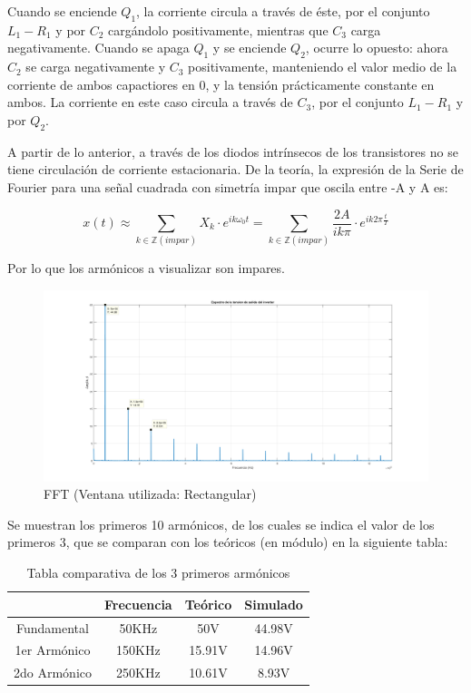 \documentclass[e4_tp3_main.tex]{subfiles}
\begin{document}
Cuando se enciende $Q_1$, la corriente circula a través de éste, por el conjunto $L_1 - R_1$ y por $C_2$ cargándolo positivamente, mientras que $C_3$ carga negativamente. Cuando se apaga $Q_1$ y se enciende $Q_2$, ocurre lo opuesto: ahora $C_2$ se carga negativamente y $C_3$ positivamente, manteniendo el valor medio de la corriente de ambos capactiores en 0, y la tensión prácticamente constante en ambos. La corriente en este caso circula a través de $C_3$, por el conjunto $L_1 - R_1$ y por $Q_2$.\par
A partir de lo anterior, a través de los diodos intrínsecos de los transistores no se tiene circulación de corriente estacionaria.
\newpage
De la teoría, la expresión de la Serie de Fourier para una señal cuadrada con simetría impar que oscila entre -A y A es:

\[
x(t) \approx \sum_{k \in \mathbb Z (impar)}^{}X_k \cdot e^{ik\omega_0 t} = \sum_{k \in \mathbb Z (impar)}^{} \frac{2A}{ik\pi} \cdot e^{ik2\pi \frac{t}{T}} 
\]

Por lo que los armónicos a visualizar son impares.

\begin{figure}[H]
\centering
\includegraphics[width=1\linewidth]{Imagenes/fft.png}
\caption{FFT (Ventana utilizada: Rectangular)}
\end{figure}

Se muestran los primeros 10 armónicos, de los cuales se indica el valor de los primeros 3, que se comparan con los teóricos (en módulo) en la siguiente tabla:

\begin{table}[ht]
\centering
\begin{tabular}{|c|c|c|c|}
\hline
             & Frecuencia & Teórico & Simulado \\ \hline
Fundamental  & 50KHz      & 50V     & 44.98V   \\ \hline
1er Armónico & 150KHz     & 15.91V  & 14.96V   \\ \hline
2do Armónico & 250KHz     & 10.61V  & 8.93V    \\ \hline
\end{tabular}
\caption{Tabla comparativa de los 3 primeros armónicos}
\end{table}
\end{document}
